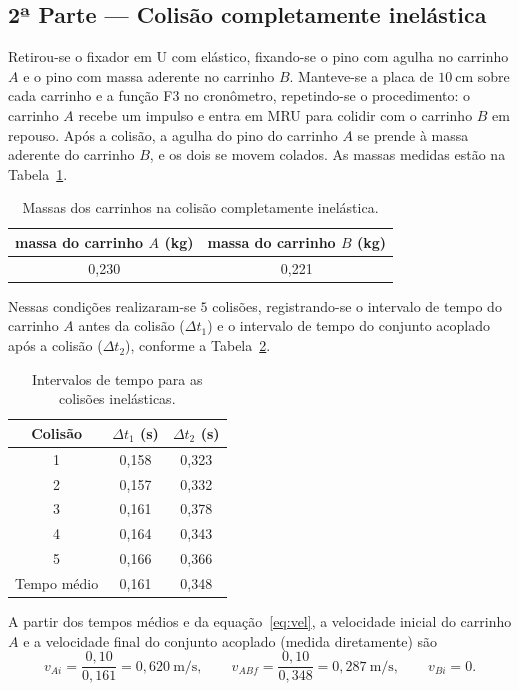 \documentclass[12pt,a4paper]{article}
\begin{document}
\subsection{2ª Parte --- Colisão completamente inelástica}
Retirou-se o fixador em U com elástico, fixando-se o pino com agulha no carrinho $A$ e o pino com
massa aderente no carrinho $B$. Manteve-se a placa de $10~\mathrm{cm}$ sobre cada carrinho e a
função F3 no cronômetro, repetindo-se o procedimento: o carrinho $A$ recebe um impulso e entra em
MRU para colidir com o carrinho $B$ em repouso. Após a colisão, a agulha do pino do carrinho $A$
se prende à massa aderente do carrinho $B$, e os dois se movem colados. As massas medidas estão
na Tabela~\ref{tab:massas-in}.

\begin{table}[!h]
	\centering
	\begin{tabular}{|c|c|} \hline \hline
	massa do carrinho $A$ (kg) & massa do carrinho $B$ (kg) \\ \hline \hline
	0,230 & 0,221 \\ \hline \hline
	\end{tabular}
	\caption{Massas dos carrinhos na colisão completamente inelástica.}
	\label{tab:massas-in}
\end{table}

Nessas condições realizaram-se $5$ colisões, registrando-se o intervalo de tempo do carrinho $A$
antes da colisão ($\Delta t_1$) e o intervalo de tempo do conjunto acoplado após a colisão
($\Delta t_2$), conforme a Tabela~\ref{tab:tempos-in}.

\begin{table}[!h]
	\centering
	\begin{tabular}{|c|c|c|} \hline \hline
	Colisão & $\Delta t_1$ (s) & $\Delta t_2$ (s) \\ \hline \hline
	1 & 0,158 & 0,323 \\ \hline
	2 & 0,157 & 0,332 \\ \hline
	3 & 0,161 & 0,378 \\ \hline
	4 & 0,164 & 0,343 \\ \hline
	5 & 0,166 & 0,366 \\ \hline
	Tempo médio & 0,161 & 0,348 \\ \hline \hline
	\end{tabular}
	\caption{Intervalos de tempo para as colisões inelásticas.}
	\label{tab:tempos-in}
\end{table}

A partir dos tempos médios e da equação~\eqref{eq:vel}, a velocidade inicial do carrinho $A$ e a
velocidade final do conjunto acoplado (medida diretamente) são
\[
v_{Ai} = \frac{0{,}10}{0{,}161} = 0{,}620~\mathrm{m/s}, \qquad
v_{ABf} = \frac{0{,}10}{0{,}348} = 0{,}287~\mathrm{m/s}, \qquad v_{Bi} = 0.
\]
\end{document}
